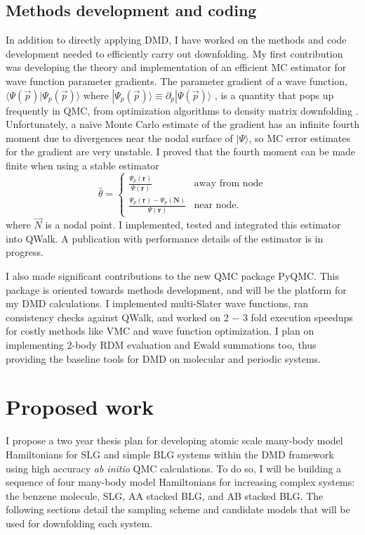 \documentclass[12pt]{article}
\begin{document}
\subsection{Methods development and coding}
In addition to directly applying DMD, I have worked on the methods and code development needed to efficiently carry out downfolding.
My first contribution was developing the theory and implementation of an efficient MC estimator for wave function parameter gradients.
The parameter gradient of a wave function, $\langle \Psi(\vec{p}) | \Psi_p (\vec{p}) \rangle$ where $| \Psi_p (\vec{p}) \rangle \equiv \partial_{p} |\Psi (\vec{p}) \rangle$ , is a quantity that pops up frequently in QMC, from optimization algorithms \cite{Toulouse2007} to density matrix downfolding \cite{2019APS..MARF18008W}.
Unfortunately, a na\"{i}ve Monte Carlo estimate of the gradient has an infinite fourth moment due to divergences near the nodal surface of $|\Psi \rangle$, so MC error estimates for the gradient are very unstable.
I proved that the fourth moment can be made finite when using a stable estimator 
\begin{equation} 
\hat{\theta}=\begin{cases}
\frac{\Psi_p(\textbf{r})}{\Psi(\textbf{r})} & \text{away from node} \\
 \frac{\Psi_p(\textbf{r})-\Psi_p(\textbf{N})}{\Psi(\textbf{r})} & \text{near node}.      
\end{cases}
\end{equation}
where $\vec{N}$ is a nodal point.
I implemented, tested and integrated this estimator into QWalk.
A publication with performance details of the estimator is in progress.

I also made significant contributions to the new QMC package PyQMC. 
This package is oriented towards methods development, and will be the platform for my DMD calculations.
I implemented multi-Slater wave functions, ran consistency checks against QWalk, and worked on 2 $-$ 3 fold execution speedups for costly methods like VMC and wave function optimization.
I plan on implementing 2-body RDM evaluation and Ewald summations too, thus providing the baseline tools for DMD on molecular and periodic systems.

\section{Proposed work}
I propose a two year thesis plan for developing atomic scale many-body
model Hamiltonians for SLG and simple BLG systems within the DMD framework using high accuracy \textit{ab initio} QMC calculations.
To do so, I will be building a sequence of four many-body model Hamiltonians for increasing complex systems: the benzene molecule, SLG, AA stacked BLG, and AB stacked BLG.
The following sections detail the sampling scheme and candidate models that will be used for downfolding each system.
\end{document}
